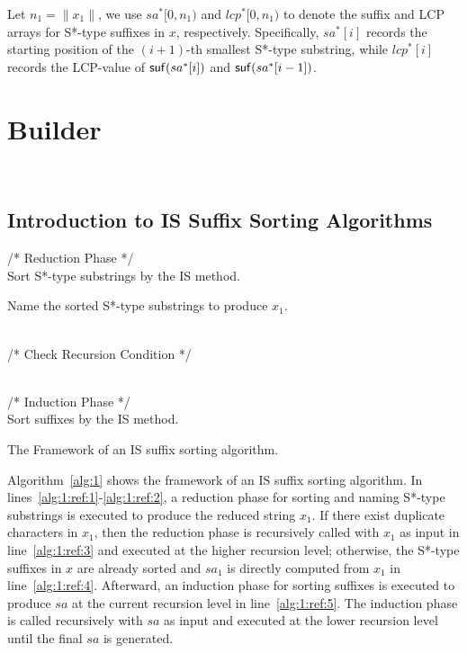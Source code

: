 \documentclass[10pt,journal,compsoc]{IEEEtran}
\begin{document}
Let $n_1 = \|x_1\|$, we use $sa^*[0, n_1)$ and $lcp^*[0, n_1)$ to denote the suffix and LCP arrays for S*-type suffixes in $x$, respectively. Specifically, $sa^*[i]$ records the starting position of the $(i + 1)$-th smallest S*-type substring, while $lcp^*[i]$ records the LCP-value of ${\sf suf}(sa^*[i])$ and ${\sf suf}(sa^*[i - 1])$.


\section{Builder}~\label{sec:builder}

\subsection{Introduction to IS Suffix Sorting Algorithms} \label{subsec:improvement}

\begin{algorithm}
	\SetAlgoNoLine
	
	/* Reduction Phase */ \\
	Sort S*-type substrings by the IS method. \label{alg:1:ref:1}
	
	Name the sorted S*-type substrings to produce $x_1$. \label{alg:1:ref:2}
	
	~\\
	
	/* Check Recursion Condition */ \\	
	
	~\\
	
	/* Induction Phase */ \\
	Sort suffixes by the IS method.  \label{alg:1:ref:5}
	
	
	\caption{The Framework of an IS suffix sorting algorithm.}
	
	\label{alg:1}
\end{algorithm}

Algorithm~\ref{alg:1} shows the framework of an IS suffix sorting algorithm. In lines~\ref{alg:1:ref:1}-\ref{alg:1:ref:2}, a reduction phase for sorting and naming S*-type substrings is executed to produce the reduced string $x_1$. If there exist duplicate characters in $x_1$, then the reduction phase is recursively called with $x_1$ as input in line~\ref{alg:1:ref:3} and executed at the higher recursion level; otherwise, the S*-type suffixes in $x$ are already sorted and $sa_1$ is directly computed from $x_1$ in line~\ref{alg:1:ref:4}. Afterward, an induction phase for sorting suffixes is executed to produce $sa$ at the current recursion level in line~\ref{alg:1:ref:5}. The induction phase is called recursively with $sa$ as input and executed at the lower recursion level until the final $sa$ is generated.
\end{document}
